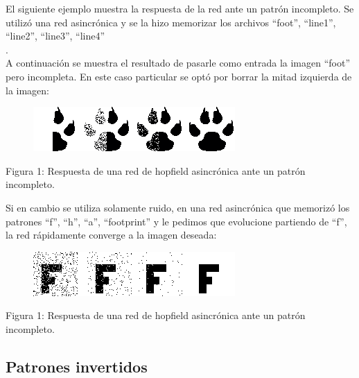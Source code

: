 \documentclass[%
    final,
    reprint,
    notitlepage,
    narroweqnarray,
    inline,
    twoside,
    invited
    ]{ieee}
\begin{document}
\par El siguiente ejemplo muestra la respuesta de la red ante un patrón incompleto. Se utilizó una red asincrónica y se la hizo memorizar los archivos ``foot'', ``line1'', ``line2'', ``line3'', ``line4''\\.\\
A continuación se muestra el resultado de pasarle como entrada la imagen ``foot'' pero incompleta. En este caso particular se optó por borrar la mitad izquierda de la imagen: \\

\begin{figure}[H]
\begin{center}
\includegraphics[scale=0.60]{./images/half.png}
\label{modelado}
\end{center}
\end{figure}

\begin{center}
\par Figura 1: Respuesta de una red de hopfield asincrónica ante un patrón incompleto.
\end{center}

\par Si en cambio se utiliza solamente ruido, en una red asincrónica que memorizó los patrones ``f'', ``h'', ``a'', ``footprint'' y le pedimos que evolucione partiendo de ``f'', la red rápidamente converge a la imagen deseada:

\begin{figure}[H]
\begin{center}
\includegraphics[scale=0.60]{./images/noisyf.png}
\label{modelado}
\end{center}
\end{figure}

\begin{center}
\par Figura 1: Respuesta de una red de hopfield asincrónica ante un patrón incompleto.
\end{center}




\subsection{Patrones invertidos}
\end{document}
